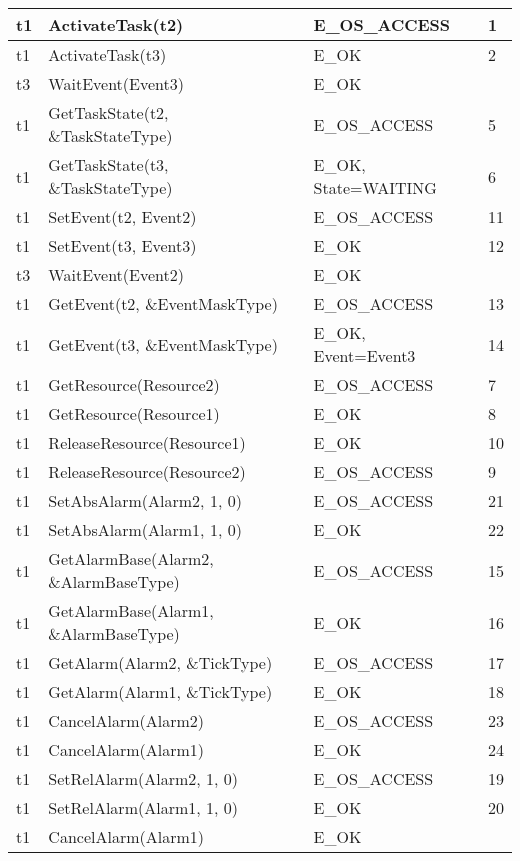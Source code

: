 \documentclass[10pt]{article}
\newlength{\Li}\settowidth{\Li}{Running}
\newlength{\Lii}\setlength{\Lii}{7cm}
\newlength{\Liiii}\setlength{\Liiii}{0.9cm}
\newlength{\Liii}\setlength{\Liii}{\textwidth} \addtolength{\Liii}{-\Li} \addtolength{\Liii}{-\Lii} \addtolength{\Liii}{-\Liiii}
\begin{document}
	\begin{supertabular}{|p{\Li}|p{\Lii}|p{\Liii}|p{\Liiii}|} \hline 
	t1		& ActivateTask(t2)								& E\_OS\_ACCESS					& 1 \\ \hline
	t1		& ActivateTask(t3)								& E\_OK							& 2 \\ \hline
	t3		& WaitEvent(Event3)								& E\_OK							& \\ \hline
	t1		& GetTaskState(t2, \&TaskStateType)				& E\_OS\_ACCESS					& 5 \\ \hline
	t1		& GetTaskState(t3, \&TaskStateType)				& E\_OK, State=WAITING				& 6 \\ \hline
	t1		& SetEvent(t2, Event2)							& E\_OS\_ACCESS					& 11 \\ \hline
	t1		& SetEvent(t3, Event3)							& E\_OK							& 12 \\ \hline
	t3		& WaitEvent(Event2)								& E\_OK							& \\ \hline
	t1		& GetEvent(t2, \&EventMaskType)					& E\_OS\_ACCESS					& 13 \\ \hline
	t1		& GetEvent(t3, \&EventMaskType)					& E\_OK, Event=Event3				& 14 \\ \hline
	
	t1		& GetResource(Resource2)						& E\_OS\_ACCESS					& 7 \\ \hline
	t1		& GetResource(Resource1)						& E\_OK							& 8 \\ \hline
	t1		& ReleaseResource(Resource1)					& E\_OK							& 10 \\ \hline
	t1		& ReleaseResource(Resource2)					& E\_OS\_ACCESS					& 9 \\ \hline
	
	t1		& SetAbsAlarm(Alarm2, 1, 0)						& E\_OS\_ACCESS					& 21 \\ \hline
	t1		& SetAbsAlarm(Alarm1, 1, 0)						& E\_OK							& 22 \\ \hline
	t1		& GetAlarmBase(Alarm2, \&AlarmBaseType)			& E\_OS\_ACCESS					& 15 \\ \hline
	t1		& GetAlarmBase(Alarm1, \&AlarmBaseType)			& E\_OK							& 16 \\ \hline
	t1		& GetAlarm(Alarm2, \&TickType)					& E\_OS\_ACCESS					& 17 \\ \hline
	t1		& GetAlarm(Alarm1, \&TickType)					& E\_OK							& 18 \\ \hline
	t1		& CancelAlarm(Alarm2)							& E\_OS\_ACCESS					& 23 \\ \hline
	t1		& CancelAlarm(Alarm1)							& E\_OK							& 24 \\ \hline
	t1		& SetRelAlarm(Alarm2, 1, 0)						& E\_OS\_ACCESS					& 19 \\ \hline
	t1		& SetRelAlarm(Alarm1, 1, 0)						& E\_OK							& 20 \\ \hline
	t1		& CancelAlarm(Alarm1)							& E\_OK							& \\ \hline
	

\end{supertabular}
\end{document}
